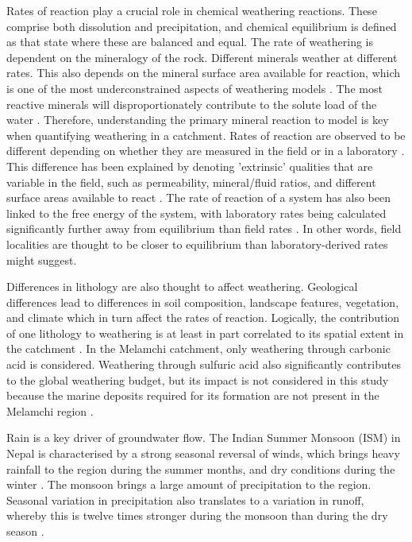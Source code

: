 \bsk

Rates of reaction play a crucial role in chemical weathering reactions. These comprise both dissolution and precipitation, and chemical equilibrium is defined as that state where these are balanced and equal. The rate of weathering is dependent on the mineralogy of the rock. Different minerals weather at different rates. This also depends on the mineral surface area available for reaction, which is one of the most underconstrained aspects of weathering models \parencite{whiteEffectTimeWeathering2003}. The most reactive minerals will disproportionately contribute to the solute load of the water \parencite{shand1999}. Therefore, understanding the primary mineral reaction to model is key when quantifying weathering in a catchment. Rates of reaction are observed to be different depending on whether they are measured in the field or in a laboratory \parencite{maherRoleReactionAffinity2009}. This difference has been explained by denoting 'extrinsic' qualities that are variable in the field, such as permeability, mineral/fluid ratios, and different surface areas available to react \parencite{whiteEffectTimeWeathering2003}. The rate of reaction of a system has also been linked to the free energy of the system, with laboratory rates being calculated significantly further away from equilibrium than field rates \parencite{kampmanFeldsparDissolutionKinetics2009}. In other words, field localities are thought to be closer to equilibrium than laboratory-derived rates might suggest. 

\bsk

Differences in lithology are also thought to affect weathering. Geological differences lead to differences in soil composition, landscape features, vegetation, and climate which in turn affect the rates of reaction. Logically, the contribution of one lithology to weathering is at least in part correlated to its spatial extent in the catchment \parencite{stallardGeochemistryAmazonInfluence1983}. In the Melamchi catchment, only weathering through carbonic acid is considered. Weathering through sulfuric acid also significantly contributes to the global weathering budget, but its impact is not considered in this study because the marine deposits required for its formation are not present in the Melamchi region \parencite{bufeCovariationSilicateCarbonate2021}.

\bsk

Rain is a key driver of groundwater flow. The Indian Summer Monsoon (ISM) in Nepal is characterised by a strong seasonal reversal of winds, which brings heavy rainfall to the region during the summer months, and dry conditions during the winter \parencite{bookhagenCompleteHimalayanHydrological2010}. The monsoon brings a large amount of precipitation to the region. Seasonal variation in precipitation also translates to a variation in runoff, whereby this is twelve times stronger during the monsoon than during the dry season \parencite{sharma1997}. 

